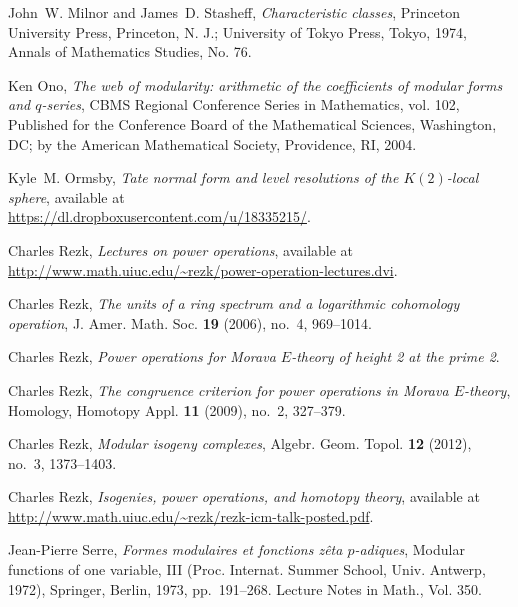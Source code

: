 \documentclass{gtpart}
\theoremstyle{definition}
\theoremstyle{remark}
\renewcommand{\=}{\approx}
\renewcommand{\-}{\sim}
\numberwithin{equation}{section}
\begin{document}
\begin{thebibliography}
John~W. Milnor and James~D. Stasheff, \emph{Characteristic classes}, Princeton
  University Press, Princeton, N. J.; University of Tokyo Press, Tokyo, 1974,
  Annals of Mathematics Studies, No. 76. 

Ken Ono, \emph{The web of modularity: arithmetic of the coefficients of modular
  forms and {$q$}-series}, CBMS Regional Conference Series in Mathematics, vol.
  102, Published for the Conference Board of the Mathematical Sciences,
  Washington, DC; by the American Mathematical Society, Providence, RI, 2004.

Kyle~M. Ormsby, \emph{Tate normal form and level resolutions of the
  {$K(2)$}-local sphere}, available at \\
  \href{https://dl.dropboxusercontent.com/u/18335215/\name}
  {https://dl.dropboxusercontent.com/u/18335215/\name}.

Charles Rezk, \emph{Lectures on power operations}, available at \\
  \href{http://www.math.uiuc.edu/~rezk/power-operation-lectures.dvi}
  {http://www.math.uiuc.edu/\textasciitilde rezk/power-operation-lectures.dvi}.

Charles Rezk, \emph{The units of a ring spectrum and a logarithmic cohomology
  operation}, J. Amer. Math. Soc. \textbf{19} (2006), no.~4, 969--1014.

Charles Rezk, \emph{Power operations for {M}orava {$E$}-theory of height 2 at 
  the prime 2}. 

Charles Rezk, \emph{The congruence criterion for power operations in {M}orava
  {$E$}-theory}, Homology, Homotopy Appl. \textbf{11} (2009), no.~2, 327--379.

Charles Rezk, \emph{Modular isogeny complexes}, Algebr. Geom. Topol. \textbf{12}
  (2012), no.~3, 1373--1403. 

Charles Rezk, \emph{Isogenies, power operations, and homotopy theory},
  available at \href{http://www.math.uiuc.edu/~rezk/rezk-icm-talk-posted.pdf}
  {http://www.math.uiuc.edu/\textasciitilde rezk/rezk-icm-talk-posted.pdf}.

Jean-Pierre Serre, \emph{Formes modulaires et fonctions z\^eta {$p$}-adiques},
  Modular functions of one variable, {III} ({P}roc. {I}nternat. {S}ummer
  {S}chool, {U}niv. {A}ntwerp, 1972), Springer, Berlin, 1973, pp.~191--268.
  Lecture Notes in Math., Vol. 350. 


\end{thebibliography}
\end{document}
